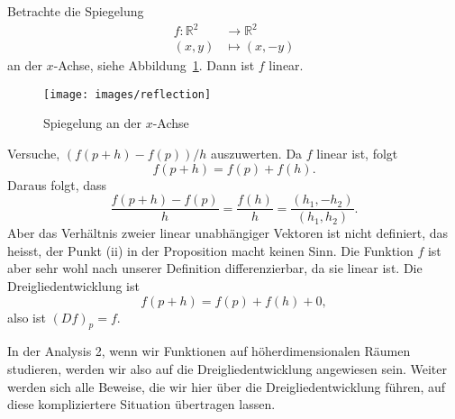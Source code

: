 \documentclass[../main.tex]{subfiles}
\begin{document}
\begin{example}
  Betrachte die Spiegelung
  \begin{align*}
    f \colon \mathbb{R}^2 & \to \mathbb{R}^2 \\
    (x, y) & \mapsto (x, -y)
  \end{align*}
  an der $x$-Achse, siehe
  Abbildung~\ref{fig:reflection}. Dann ist $f$ linear.

\begin{figure}[htb]
  \centering
  \texttt{[image: images/reflection]}
  \caption{Spiegelung an der $x$-Achse}%
  \label{fig:reflection}
\end{figure}

  Versuche,
$(f(p + h) - f(p))/h$
auszuwerten. Da $f$ linear ist, folgt
\[
  f(p + h) = f(p) + f(h).
\]
Daraus folgt,
dass
\[
  \frac{f(p+h) - f(p)}{h} = \frac{f(h)}{h}
  = \frac{(h_1, -h_2)}{(h_1, h_2)}.
\]
Aber das Verhältnis zweier linear unabhängiger
Vektoren ist nicht definiert,
das heisst, der Punkt (ii) in der Proposition
macht keinen Sinn.
Die Funktion $f$ ist aber sehr wohl
nach unserer Definition differenzierbar,
da sie linear ist. Die Dreigliedentwicklung
ist
\[
  f(p + h) = f(p) + f(h) + 0,
\]
also ist ${(Df)}_p = f$.

In der Analysis 2, wenn wir Funktionen
auf höherdimensionalen Räumen
studieren, werden wir also auf
die Dreigliedentwicklung angewiesen sein.
Weiter werden sich alle Beweise, die wir
hier über die Dreigliedentwicklung führen,
auf diese kompliziertere Situation
übertragen lassen.
\end{example}
\end{document}
